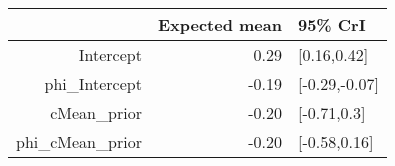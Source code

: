 \begin{tabular}{rrl}
  \hline
 & Expected mean & 95\% CrI \\ 
  \hline
Intercept & 0.29 & [0.16,0.42] \\ 
  phi\_Intercept & -0.19 & [-0.29,-0.07] \\ 
  cMean\_prior & -0.20 & [-0.71,0.3] \\ 
  phi\_cMean\_prior & -0.20 & [-0.58,0.16] \\ 
   \hline
\end{tabular}


